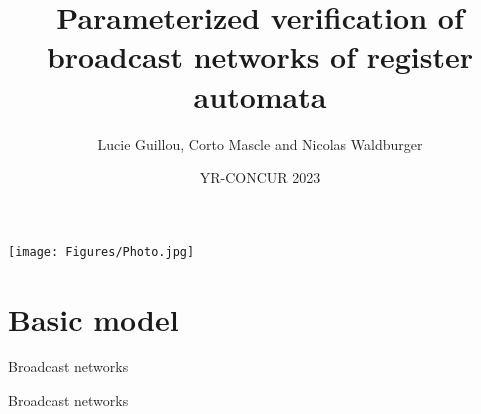 \documentclass{beamer}
\begin{document}
	
	\title[]{Parameterized verification of broadcast networks of register automata}
	\date[]{YR-CONCUR 2023}
	\author[]{Lucie Guillou, Corto Mascle and Nicolas Waldburger}
%	
\begin{frame}
	\titlepage
\end{frame}

\begin{frame}
	\texttt{[image: Figures/Photo.jpg]}
\end{frame}


\section{Basic model}
%


\begin{frame}
	\tableofcontents[currentsection]
\end{frame}

\begin{frame}{Broadcast networks}
	
\end{frame}


\begin{frame}{Broadcast networks}
	
\end{frame}
\end{document}
